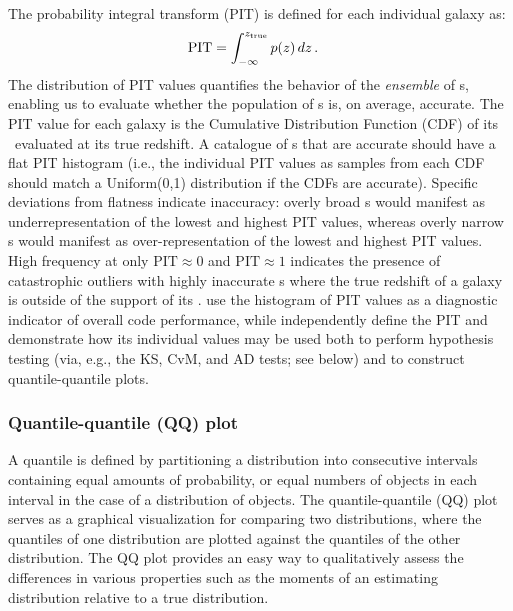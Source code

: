 The probability integral transform (PIT) \citep{Polsterer:16} is defined for each individual galaxy as:
\begin{align}
\label{eq:pit}
\mathrm{PIT} &= \int_{-\infty}^{z_{\rm true}}p(z)\, dz \,.
\end{align}
The distribution of PIT values quantifies the behavior of the {\it ensemble} of \pzpdf s, enabling us to evaluate whether the population of \pdpdf s is, on average, accurate.
The PIT value for each galaxy is the Cumulative Distribution Function (CDF) of its \pzpdf\ evaluated at its true redshift.
A catalogue of \pzpdf s that are accurate should have a flat PIT histogram (i.e., the individual PIT values as samples from each CDF should match a Uniform(0,1) distribution if the CDFs are accurate).
Specific deviations from flatness indicate inaccuracy: overly broad \pzpdf s would manifest as underrepresentation of the lowest and highest PIT values, whereas overly narrow \pzpdf s would manifest as over-representation of the lowest and highest PIT values.
High frequency at only $\mathrm{PIT}\approx0$ and $\mathrm{PIT}\approx1$ indicates the presence of catastrophic outliers with highly inaccurate \pzpdf s where the true redshift of a galaxy is outside of the support of its \pzpdf.
\citet{Tanaka:17} use the histogram of PIT values as a diagnostic indicator of overall code performance, while \citet{Freeman:17} independently define the PIT and demonstrate how its individual values may be used both to perform hypothesis testing (via, e.g., the KS, CvM, and AD tests; see below) and to construct quantile-quantile plots.

\subsubsection{Quantile-quantile (QQ) plot}
\label{sec:qq}

A quantile is defined by partitioning a distribution into consecutive intervals containing equal amounts of probability, or equal numbers of objects in each interval in the case of a distribution of objects.
The quantile-quantile (QQ) plot serves as a graphical visualization for comparing two distributions, where the quantiles of one distribution are plotted against the quantiles of the other distribution.
The QQ plot provides an easy way to qualitatively assess the differences in various properties such as the moments of an estimating distribution relative to a true distribution.

